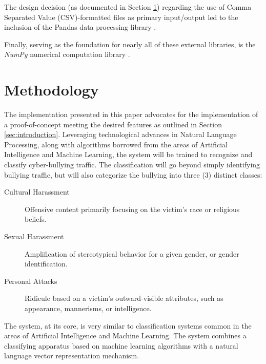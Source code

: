 \documentclass[conference]{sig-alternate-05-2015}
\begin{document}
The design decision (as documented in Section \ref{sec:design}) regarding the
use of Comma Separated Value (CSV)-formatted files as primary input/output led
to the inclusion of the Pandas data processing library
\cite{mckinney-proc-scipy-2010}.

Finally, serving as the foundation for nearly all of these external libraries,
is the \textit{NumPy} numerical computation library \cite{oliphant2006guide}.

\section{Methodology}\label{sec:design}
The implementation presented in this paper advocates for the implementation of a
proof-of-concept meeting the desired features as outlined in Section \ref{sec:introduction}.
Leveraging technological advances in Natural
Language Processing, along with algorithms borrowed from the areas of Artificial
Intelligence and Machine Learning, the system will be trained to recognize and
classify cyber-bullying traffic. The classification will go beyond simply
identifying bullying traffic, but will also categorize the bullying into three
(3) distinct classes:
\begin{description}
    \item[Cultural Harassment] Offensive content primarily focusing on the
    victim's race or religious beliefs.
    \item[Sexual Harassment] Amplification of stereotypical behavior for a given
    gender, or gender identification.
    \item[Personal Attacks] Ridicule based on a victim's outward-visible
    attributes, such as appearance, mannerisms, or intelligence.
\end{description}

The system, at its core, is very similar to classification systems
common in the areas of Artificial Intelligence and Machine Learning. The system
combines a classifying apparatus based on machine learning algorithms with a
natural language vector representation mechanism.
\end{document}
